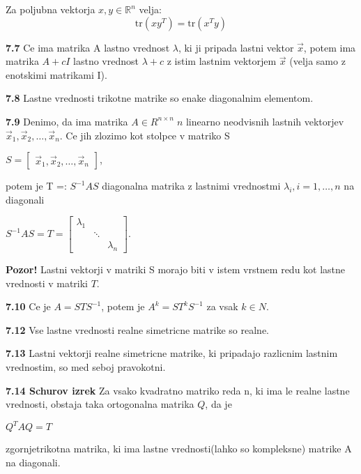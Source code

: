 \documentclass{article}
\begin{document}
\begin{multicols}{2}
Za poljubna vektorja \( x,y \in \mathbb{R}^n \) velja:
\[
    \text{tr} (xy^T) = \text{tr}(x^Ty)
\]


\textbf{7.7} Ce ima matrika A lastno vrednost $\lambda$, ki ji pripada lastni vektor $\vec{x}$,
potem ima matrika $A + cI$ lastno vrednost $\lambda + c$ z istim lastnim vektorjem $\vec{x}$ (velja samo z
enotskimi matrikami I).

\textbf{7.8} Lastne vrednosti trikotne matrike so enake diagonalnim elementom.

\textbf{7.9} Denimo, da ima matrika $A \in R^{n \times n}\; n$ linearno neodvisnih lastnih vektorjev
$\vec{x}_{1}, \vec{x}_{2}, \dots, \vec{x}_{n}$. Ce jih zlozimo kot stolpce v matriko S
\begin{center}
    \begin{math}
        S =
        \begin{bmatrix}
            \vec{x}_{1}, \vec{x}_{2}, \dots, \vec{x}_{n}
        \end{bmatrix}
    \end{math},
\end{center}
potem je T =: $S^{-1}AS$ diagonalna matrika z lastnimi vrednostmi $\lambda_{i}, i = 1, \dots, n$ na diagonali
\begin{center}
    \begin{math}
        S^{-1}AS = T =
        \begin{bmatrix}
            \lambda_{1} & &\\
            &   \ddots  &  \\
            & &     \lambda_{n} 
        \end{bmatrix}
    \end{math}.
\end{center}

\textbf{Pozor!} Lastni vektorji v matriki S morajo biti v istem vrstnem redu kot lastne vrednosti v matriki $T$.

\textbf{7.10} Ce je $A = STS^{-1}$, potem je $A^{k} = ST^{k}S^{-1}$ za vsak $k \in N$.

\textbf{7.12} Vse lastne vrednosti realne simetricne matrike so realne.

\textbf{7.13} Lastni vektorji realne simetricne matrike, ki pripadajo razlicnim lastnim
vrednostim, so med seboj pravokotni.

\textbf{7.14 Schurov izrek} Za vsako kvadratno matriko reda n, ki ima le realne lastne vrednosti,
obstaja taka ortogonalna matrika $Q$, da je 
\begin{center}
    \begin{math}
        Q^{T}AQ = T
    \end{math}
\end{center} 
zgornjetrikotna matrika, ki ima lastne vrednosti(lahko so kompleksne) matrike A na diagonali.


\end{multicols}
\end{document}
